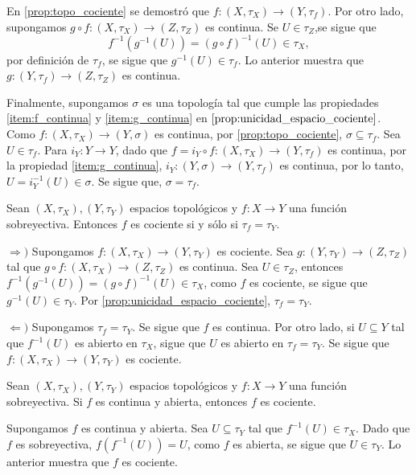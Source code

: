 \begin{dem}
    En \ref{prop:topo_cociente} se demostró que $f:(X,\tau_X)\to (Y,\tau_f)$. Por otro lado, supongamos 
    $g\circ f:(X,\tau_X)\to (Z,\tau_Z)$ es continua. Se $U\in \tau_Z$,se sigue que 
    $$f^{-1}(g^{-1}(U))=(g\circ f)^{-1}(U)\in\tau_X,$$ por definición de $\tau_f$, se sigue que $g^{-1}(U)\in\tau_f$. Lo anterior muestra que $g: (Y,\tau_f)\to(Z,\tau_Z)$ es continua.

    Finalmente, supongamos $\sigma$ es una topología tal que cumple las propiedades \ref{item:f_continua} y \ref{item:g_continua} en $\ref{prop:unicidad_espacio_cociente}$. Como $f:(X,\tau_X)\to(Y,\sigma)$ es continua, por \ref{prop:topo_cociente}, $\sigma\subseteq \tau_f$. Sea $U\in \tau_f$. Para $i_Y:Y\to Y$, dado que $f=i_Y\circ f:(X,\tau_X)\to(Y,\tau_f)$ es continua, por la propiedad \ref{item:g_continua}, $i_Y:(Y,\sigma)\to (Y,\tau_f)$ es continua, por lo tanto, $U=i_Y^{-1}(U)\in\sigma$. Se sigue que, $\sigma=\tau_f$.
\end{dem}
\begin{prop}
    Sean $(X,\tau_X), (Y,\tau_Y)$ espacios topológicos y $f:X\to Y$ una función sobreyectiva. Entonces $f$ es  cociente si y sólo si $\tau_f=\tau_Y$.
\end{prop}
\begin{dem}
    $\Rightarrow)$ Supongamos $f:(X,\tau_X)\to(Y,\tau_Y)$ es cociente. Sea $g:(Y,\tau_Y)\to(Z,\tau_Z)$ tal que $g\circ f:(X,\tau_X)\to(Z,\tau_Z)$ es continua. Sea $U\in \tau_Z$, entonces $f^{-1}(g^{-1}(U))=(g\circ f)^{-1}(U)\in\tau_X$, como $f$ es cociente, se sigue que $g^{-1}(U)\in \tau_Y$. Por \ref{prop:unicidad_espacio_cociente}, $\tau_f=\tau_Y$.
    
    $\Leftarrow)$ Supongamos $\tau_f=\tau_Y$. Se sigue que $f$ es continua. Por otro lado, si $U\subseteq Y$ tal que $f^{-1}(U)$ es abierto en  $\tau_X$, sigue que $U$ es abierto en $\tau_f=\tau_Y$. Se sigue que $f:(X,\tau_X)\to(Y,\tau_Y)$ es cociente.
\end{dem}
\begin{prop}
\label{prop:continua_abierta_implica_cociente}
    Sean $(X,\tau_X), (Y,\tau_Y)$ espacios topológicos y $f:X\to Y$ una función sobreyectiva. Si $f$ es continua y abierta, entonces $f$ es cociente.
\end{prop}
\begin{dem}
    Supongamos $f$ es continua y abierta. Sea $U\subseteq \tau_Y$ tal que $f^{-1}(U)\in\tau_X$. Dado que $f$ es sobreyectiva, $f(f^{-1}(U))=U$, como $f$ es abierta, se sigue que $U\in \tau_Y$. Lo anterior muestra que $f$ es cociente.
\end{dem}
